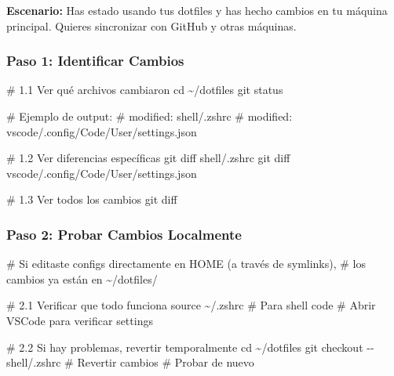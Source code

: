 \documentclass[
  doc,
  floatsintext,
  longtable,
  a4paper,
  nolmodern,
  notxfonts,
  notimes,
  12pt,
  colorlinks=true,linkcolor=blue,citecolor=blue,urlcolor=blue]{apa7}
\newenvironment{Shaded}{\begin{snugshade}}{\end{snugshade}}
\newcommand{\AttributeTok}[1]{\textcolor[rgb]{0.40,0.45,0.13}{#1}}
\newcommand{\BuiltInTok}[1]{\textcolor[rgb]{0.00,0.23,0.31}{#1}}
\newcommand{\CommentTok}[1]{\textcolor[rgb]{0.37,0.37,0.37}{#1}}
\newcommand{\ExtensionTok}[1]{\textcolor[rgb]{0.00,0.23,0.31}{#1}}
\newcommand{\FunctionTok}[1]{\textcolor[rgb]{0.28,0.35,0.67}{#1}}
\newcommand{\NormalTok}[1]{\textcolor[rgb]{0.00,0.23,0.31}{#1}}
\begin{document}
\textbf{Escenario:} Has estado usando tus dotfiles y has hecho cambios
en tu máquina principal. Quieres sincronizar con GitHub y otras
máquinas.

\subsubsection{Paso 1: Identificar
Cambios}\label{paso-1-identificar-cambios}

\begin{Shaded}
\begin{Highlighting}[]
\CommentTok{\# 1.1 Ver qué archivos cambiaron}
\BuiltInTok{cd}\NormalTok{ \textasciitilde{}/dotfiles}
\FunctionTok{git}\NormalTok{ status}

\CommentTok{\# Ejemplo de output:}
\CommentTok{\# modified:   shell/.zshrc}
\CommentTok{\# modified:   vscode/.config/Code/User/settings.json}

\CommentTok{\# 1.2 Ver diferencias específicas}
\FunctionTok{git}\NormalTok{ diff shell/.zshrc}
\FunctionTok{git}\NormalTok{ diff vscode/.config/Code/User/settings.json}

\CommentTok{\# 1.3 Ver todos los cambios}
\FunctionTok{git}\NormalTok{ diff}
\end{Highlighting}
\end{Shaded}

\subsubsection{Paso 2: Probar Cambios
Localmente}\label{paso-2-probar-cambios-localmente}

\begin{Shaded}
\begin{Highlighting}[]
\CommentTok{\# Si editaste configs directamente en HOME (a través de symlinks),}
\CommentTok{\# los cambios ya están en \textasciitilde{}/dotfiles/}

\CommentTok{\# 2.1 Verificar que todo funciona}
\BuiltInTok{source}\NormalTok{ \textasciitilde{}/.zshrc  }\CommentTok{\# Para shell}
\ExtensionTok{code}  \CommentTok{\# Abrir VSCode para verificar settings}

\CommentTok{\# 2.2 Si hay problemas, revertir temporalmente}
\BuiltInTok{cd}\NormalTok{ \textasciitilde{}/dotfiles}
\FunctionTok{git}\NormalTok{ checkout }\AttributeTok{{-}{-}}\NormalTok{ shell/.zshrc  }\CommentTok{\# Revertir cambios}
\CommentTok{\# Probar de nuevo}
\end{Highlighting}
\end{Shaded}
\end{document}
